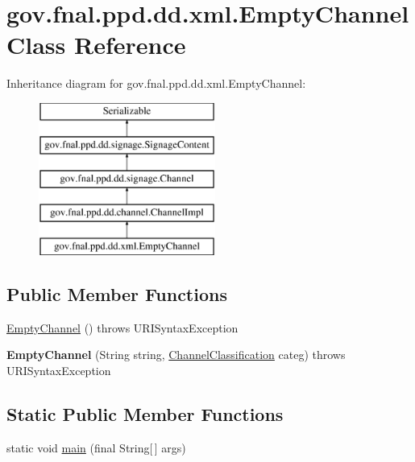 \hypertarget{classgov_1_1fnal_1_1ppd_1_1dd_1_1xml_1_1EmptyChannel}{\section{gov.\-fnal.\-ppd.\-dd.\-xml.\-Empty\-Channel Class Reference}
\label{classgov_1_1fnal_1_1ppd_1_1dd_1_1xml_1_1EmptyChannel}
}
Inheritance diagram for gov.\-fnal.\-ppd.\-dd.\-xml.\-Empty\-Channel\-:\begin{figure}[H]
\begin{center}
\leavevmode
\includegraphics[height=5.000000cm]{classgov_1_1fnal_1_1ppd_1_1dd_1_1xml_1_1EmptyChannel}
\end{center}
\end{figure}
\subsection*{Public Member Functions}
\begin{DoxyCompactItemize}
\item 
\hyperlink{classgov_1_1fnal_1_1ppd_1_1dd_1_1xml_1_1EmptyChannel_aa5fef3cb69b155b97f5984de3407b927}{Empty\-Channel} ()  throws U\-R\-I\-Syntax\-Exception 
\item 
\hypertarget{classgov_1_1fnal_1_1ppd_1_1dd_1_1xml_1_1EmptyChannel_a0bb92f6a27ea9a2049b5f44b0a57b0ba}{{\bfseries Empty\-Channel} (String string, \hyperlink{classgov_1_1fnal_1_1ppd_1_1dd_1_1changer_1_1ChannelClassification}{Channel\-Classification} categ)  throws U\-R\-I\-Syntax\-Exception }\label{classgov_1_1fnal_1_1ppd_1_1dd_1_1xml_1_1EmptyChannel_a0bb92f6a27ea9a2049b5f44b0a57b0ba}

\end{DoxyCompactItemize}
\subsection*{Static Public Member Functions}
\begin{DoxyCompactItemize}
\item 
static void \hyperlink{classgov_1_1fnal_1_1ppd_1_1dd_1_1xml_1_1EmptyChannel_a149cbad6be33e6bf6e45608bffc2f95e}{main} (final String\mbox{[}$\,$\mbox{]} args)
\end{DoxyCompactItemize}
